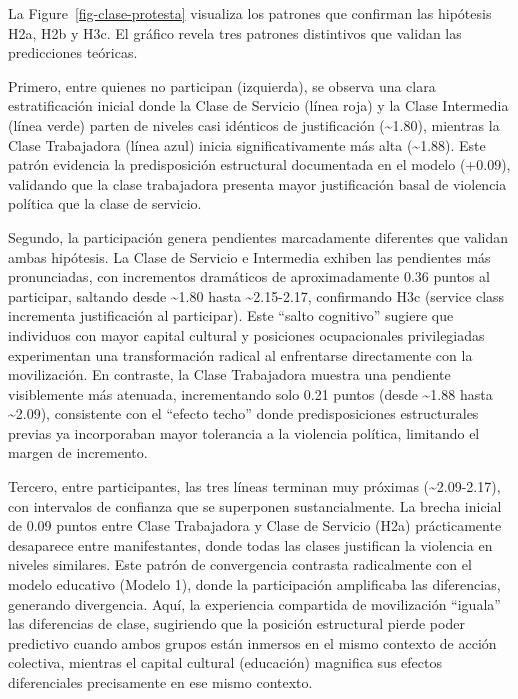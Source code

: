 \documentclass[
  13pt,
]{article}
\begin{document}
La Figure~\ref{fig-clase-protesta} visualiza los patrones que confirman
las hipótesis H2a, H2b y H3c. El gráfico revela tres patrones
distintivos que validan las predicciones teóricas.

Primero, entre quienes no participan (izquierda), se observa una clara
estratificación inicial donde la Clase de Servicio (línea roja) y la
Clase Intermedia (línea verde) parten de niveles casi idénticos de
justificación (\textasciitilde1.80), mientras la Clase Trabajadora
(línea azul) inicia significativamente más alta (\textasciitilde1.88).
Este patrón evidencia la predisposición estructural documentada en el
modelo (+0.09), validando que la clase trabajadora presenta mayor
justificación basal de violencia política que la clase de servicio.

Segundo, la participación genera pendientes marcadamente diferentes que
validan ambas hipótesis. La Clase de Servicio e Intermedia exhiben las
pendientes más pronunciadas, con incrementos dramáticos de
aproximadamente 0.36 puntos al participar, saltando desde
\textasciitilde1.80 hasta \textasciitilde2.15-2.17, confirmando H3c
(service class incrementa justificación al participar). Este ``salto
cognitivo'' sugiere que individuos con mayor capital cultural y
posiciones ocupacionales privilegiadas experimentan una transformación
radical al enfrentarse directamente con la movilización. En contraste,
la Clase Trabajadora muestra una pendiente visiblemente más atenuada,
incrementando solo 0.21 puntos (desde \textasciitilde1.88 hasta
\textasciitilde2.09), consistente con el ``efecto techo'' donde
predisposiciones estructurales previas ya incorporaban mayor tolerancia
a la violencia política, limitando el margen de incremento.

Tercero, entre participantes, las tres líneas terminan muy próximas
(\textasciitilde2.09-2.17), con intervalos de confianza que se
superponen sustancialmente. La brecha inicial de 0.09 puntos entre Clase
Trabajadora y Clase de Servicio (H2a) prácticamente desaparece entre
manifestantes, donde todas las clases justifican la violencia en niveles
similares. Este patrón de convergencia contrasta radicalmente con el
modelo educativo (Modelo 1), donde la participación amplificaba las
diferencias, generando divergencia. Aquí, la experiencia compartida de
movilización ``iguala'' las diferencias de clase, sugiriendo que la
posición estructural pierde poder predictivo cuando ambos grupos están
inmersos en el mismo contexto de acción colectiva, mientras el capital
cultural (educación) magnifica sus efectos diferenciales precisamente en
ese mismo contexto.
\end{document}
